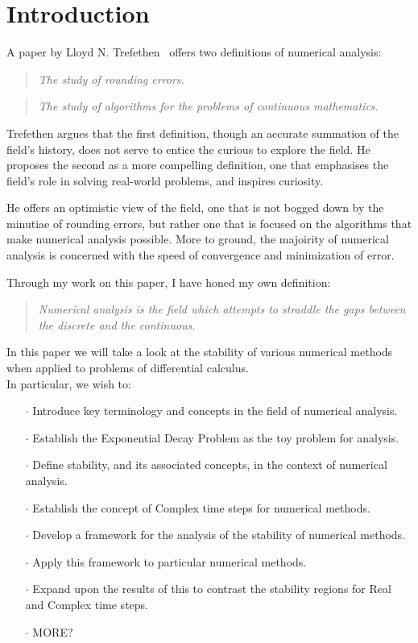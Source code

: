 \section{Introduction}
\par A paper by Lloyd N. Trefethen~\cite{trefethen_definition} offers two definitions of numerical analysis:
\begin{quote}
    \textit{The study of rounding errors.}
\end{quote}
\begin{quote}
    \textit{The study of algorithms for the problems of continuous mathematics.}
\end{quote}

\par Trefethen argues that the first definition, though an accurate summation of the field's history, does not serve to entice the curious to explore the field. He proposes the second as a more compelling definition, one that emphasises the field's role in solving real-world problems, and inspires curiosity.

\par He offers an optimistic view of the field, one that is not bogged down by the minutiae of rounding errors, but rather one that is focused on the algorithms that make numerical analysis possible. More to ground, the majoirity of numerical analysis is concerned with the speed of convergence and minimization of error.

Through my work on this paper, I have honed my own definition:
\begin{quote}
	\textit{Numerical analysis is the field which attempts to straddle the gaps between the discrete and the continuous.}
\end{quote}

In this paper we will take a look at the stability of various numerical methods when applied to problems of differential calculus.\\
In particular, we wish to:
\begin{itemize}
	\item[$\cdot$] Introduce key terminology and concepts in the field of numerical analysis.
	\item[$\cdot$] Establish the Exponential Decay Problem as the toy problem for analysis.
	\item[$\cdot$] Define stability, and its associated concepts, in the context of numerical analysis.
	\item[$\cdot$] Establish the concept of Complex time steps for numerical methods.
	\item[$\cdot$] Develop a framework for the analysis of the stability of numerical methods.
	\item[$\cdot$] Apply this framework to particular numerical methods.
	\item[$\cdot$] Expand upon the results of this to contrast the stability regions for Real and Complex time steps.
	\item[$\cdot$] MORE?
\end{itemize}
